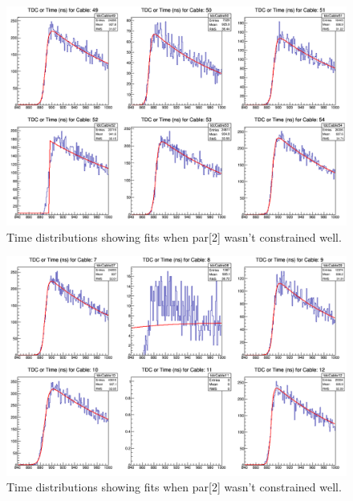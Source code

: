 \documentclass[12pt,epsfig]{article}
\begin{document}
\begin{figure}
    \centering
    \includegraphics[width=1.0\textwidth]{Figures/tdcForRun068_Cables49to54.png}
    \caption{Time distributions showing fits when par[2] wasn't constrained well.}
    \label{tdcSharp2}
\end{figure}

\begin{figure}
    \centering
    \includegraphics[width=1.0\textwidth]{Figures/tdcForRun068_Cables07to12.png}
    \caption{Time distributions showing fits when par[2] wasn't constrained well.}
    \label{tdcFlatFit}
\end{figure}
\end{document}

